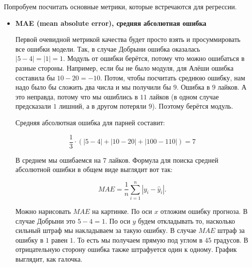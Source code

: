 \documentclass[12pt, a4paper, oneside]{article}
\theoremstyle{plain} %
\theoremstyle{definition}
\newcommand{\indef}[1]{\textbf{ \color{green} #1}}
\begin{document}
\begin{solution}
Попробуем посчитать основные метрики, которые встречаются для регрессии. 
\begin{itemize}
	\item \indef{MAE (mean absolute error), средняя абсолютная ошибка}
	
	Первой очевидной метрикой качества будет просто взять и просуммировать все ошибки модели. Так, в случае Добрыни ошибка оказалась $|5 - 4| = |1| = 1$. Модуль от ошибки берётся, потому что можно ошибаться в разные стороны. Например, если бы не было модуля, для Алёши ошибка составила бы $10 - 20 = -10$. Потом, чтобы посчитать среднюю ошибку, нам надо было бы сложить два числа и мы получили бы $9$. Ошибка в $9$ лайков. А это неправда, потому что мы ошиблись в $11$ лайков (в одном случае предсказали $1$ лишний, а в другом потеряли $9$). Поэтому берётся модуль. 
	
	Средняя абсолютная ошибка для парней составит: 
	
	$$ 
	\frac{1}{3} \cdot (|5 - 4| + |10 - 20| + |100 - 110|) = 7
	$$
	
	В среднем мы ошибаемся на $7$ лайков. Формула для поиска средней абсолютной ошибки в общем виде выглядит вот так: 
	
	$$
	MAE = \frac{1}{n}\sum_{i=1}^{n} |y_i - \hat{y}_i|.
	$$
	 
	 Можно нарисовать $MAE$ на картинке. По оси $x$ отложим ошибку прогноза. В случае Добрыни это $5-4 = 1$. По оси $y$ будем откладывать то, насколько сильный штраф мы накладываем за такую ошибку. В случае $MAE$ штраф за ошибку в $1$ равен $1$. То есть мы получаем прямую под углом в $45$ градусов. В отрицательную сторону ошибка также штрафуется один к одному. График выглядит, как галочка. 

\begin{center}
\end{center}
\end{itemize}
\end{solution}
\end{document}
